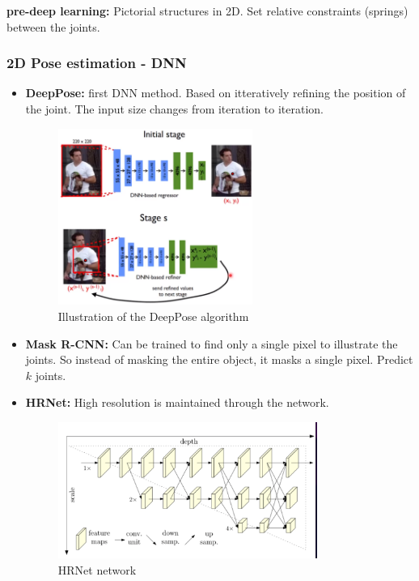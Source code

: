 \documentclass[a4paper]{article}
\begin{document}
\textbf{pre-deep learning:} Pictorial structures in 2D. Set relative constraints (springs) between the joints. 

\subsubsection*{2D Pose estimation - DNN}
\begin{itemize}
	\item \textbf{DeepPose:} first DNN method. Based on itteratively refining the position of the joint. The input size changes from iteration to iteration.
		\begin{figure}[H]
		\centering
		\includegraphics[width=0.6\textwidth]{figures/DeepPose.png}
		\caption{Illustration of the DeepPose algorithm}
		\label{fig:deep_pose_algorithm}
		\end{figure} 
	\item \textbf{Mask R-CNN:} Can be trained to find only a single pixel to illustrate the joints. So instead of masking the entire object, it masks a single pixel. Predict $ k $ joints.  
	\item \textbf{HRNet:} High resolution is maintained through the network.   
		\begin{figure}[H]
		\centering
		\includegraphics[width=0.8\textwidth]{figures/HRNet.png}
		\caption{HRNet network}
		\label{fig:HRNet}
		\end{figure} 
\end{itemize} 
\end{document}
